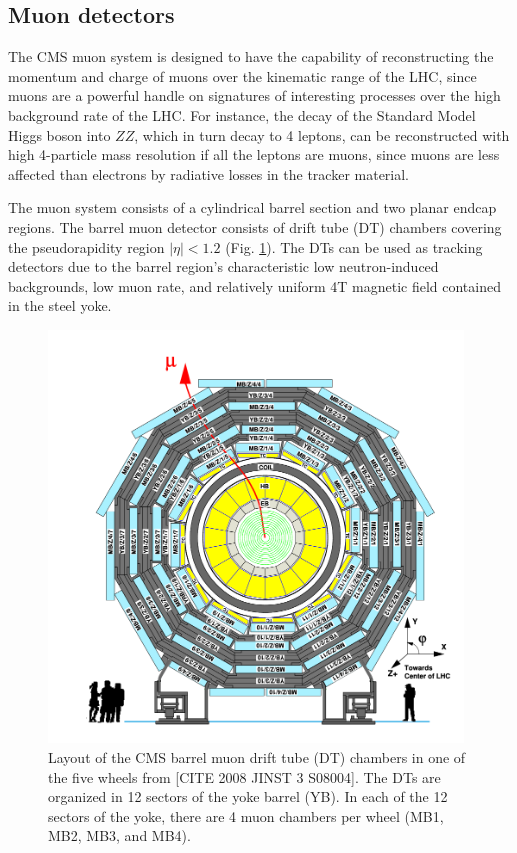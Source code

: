 \subsection{Muon detectors}

The CMS muon system is designed to have the capability of reconstructing the momentum and charge of muons over the kinematic range of the LHC, since muons are a powerful handle on signatures of interesting processes over the high background rate of the LHC. For instance, the decay of the Standard Model Higgs boson into $ZZ$, which in turn decay to 4 leptons, can be reconstructed with high 4-particle mass resolution if all the leptons are muons, since muons are less affected than electrons by radiative losses in the tracker material. 

The muon system consists of a cylindrical barrel section and two planar endcap regions. The barrel muon detector consists of drift tube (DT) chambers covering the pseudorapidity region $|\eta| < 1.2$ (Fig. \ref{fig:phase-1-muon-barrel-DT-schematic}). The DTs can be used as tracking detectors due to the barrel region's characteristic low neutron-induced backgrounds, low muon rate, and relatively uniform 4T magnetic field contained in the steel yoke. 

\begin{figure}[ht]
    \centering
    \includegraphics[width=11cm]{figures/ch-2-cern-cms/phase-1-muon-barrel-DT-schematic.png}
    \caption{Layout of the CMS barrel muon drift tube (DT) chambers in one of the five wheels from [CITE 2008 JINST 3 S08004]. The DTs are organized in 12 sectors of the yoke barrel (YB). In each of the 12 sectors of the yoke, there are 4 muon chambers per wheel (MB1, MB2, MB3, and MB4).}
    \label{fig:phase-1-muon-barrel-DT-schematic}
\end{figure}

